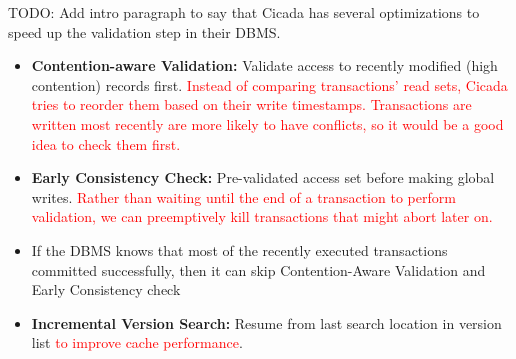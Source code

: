 \documentclass[11pt]{article}
\newcommand{\rr}[1]{\textcolor{red}{#1}}
\begin{document}
TODO: Add intro paragraph to say that Cicada has several optimizations to speed up the validation step in their DBMS.

\begin{itemize}
    \item \textbf{Contention-aware Validation:}
    Validate access to recently modified (high contention) records first. \rr{Instead of comparing transactions' read sets, Cicada tries to reorder them based on their write timestamps. Transactions are written most recently are more likely to have conflicts, so it would be a good idea to check them first.}
    
    \item \textbf{Early Consistency Check:}
    Pre-validated access set before making global writes. \rr{Rather than waiting until the end of a transaction to perform validation, we can preemptively kill transactions that might abort later on.}
    
    \item If the DBMS knows that most of the recently executed transactions committed successfully,
    then it can skip Contention-Aware Validation and Early Consistency check
    
    \item \textbf{Incremental Version Search:}
    Resume from last search location in version list \rr{to improve cache performance}.
\end{itemize}


\newpage


\end{document}
